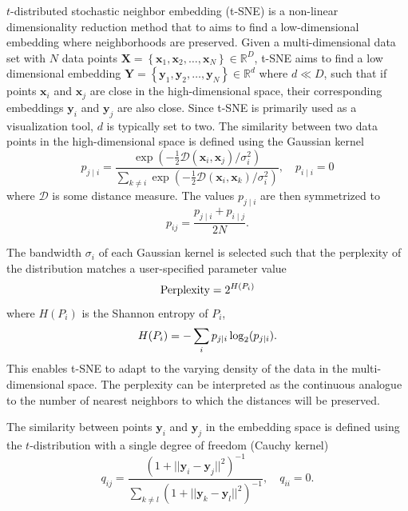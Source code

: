 \documentclass[article]{jss}
\begin{document}
$t$-distributed stochastic neighbor embedding (t-SNE) is a non-linear
dimensionality reduction method that to aims to find a low-dimensional embedding
where neighborhoods are preserved. Given a multi-dimensional data set with $N$ data points
$\mathbf{X} = \left \{ \mathbf{x}_1, \mathbf{x}_2, \dots, \mathbf{x}_N \right \}
\in \mathbb{R}^D$, t-SNE
aims to find a low dimensional embedding $\mathbf{Y} = \left \{ \mathbf{y}_1,
\mathbf{y}_2, \dots, \mathbf{y}_N \right\} \in \mathbb{R}^d$ where $d \ll D$,
such that if points $\mathbf{x}_i$ and $\mathbf{x}_j$ are close in the
high-dimensional space, their corresponding embeddings $\mathbf{y}_i$ and
$\mathbf{y}_j$ are also close. Since t-SNE is primarily used as a visualization
tool, $d$ is typically set to two. The similarity between two data points in the
high-dimensional space is defined using the Gaussian kernel
\begin{equation}
p_{j \mid i} = \frac{\exp \left ( -\frac{1}{2} \mathcal{D}(\mathbf{x}_i, \mathbf{x}_j ) / \sigma_i^2 \right )}
{\sum_{k \neq i } \exp \left ( -\frac{1}{2} \mathcal{D}(\mathbf{x}_i, \mathbf{x}_k ) / \sigma_i^2 \right )}, \quad p_{i \mid i} = 0
\label{eq:p_ij}
\end{equation}
where $\mathcal{D}$ is some distance measure. The values $p_{j \mid i}$
are then symmetrized to
\begin{equation}
p_{ij} = \frac{p_{j \mid i} + p_{i \mid j}}{2N}.
\label{eq:symmetrize}
\end{equation}

The bandwidth $\sigma_i$ of each Gaussian kernel is selected such that the perplexity of the distribution matches a user-specified parameter value
\begin{equation}
\text{Perplexity} = 2^{H(P_i)} \notag
\end{equation}
where $H(P_i)$ is the Shannon entropy of $P_i$,
\begin{equation}
H(P_i) = -\sum_i p_{j \mid i} \log_2 (p_{j \mid i}). \notag
\end{equation}
This enables t-SNE to adapt to the varying density of the data in the
multi-dimensional space. The perplexity can be interpreted as the continuous
analogue to the number of nearest neighbors to which the distances will be
preserved. 

The similarity between points $\mathbf{y}_i$ and $\mathbf{y}_j$ in the embedding
space is defined using the $t$-distribution with a single degree of freedom
(Cauchy kernel)
\begin{equation}
q_{ij} = \frac{\left ( 1 + || \mathbf{y}_i - \mathbf{y}_j ||^2 \right )^{-1}}
{\sum_{k \neq l}\left ( 1 + || \mathbf{y}_k - \mathbf{y}_l ||^2 \right )^{-1}},
\quad q_{ii} = 0.
\label{eq:cauchy_kernel}
\end{equation}
\end{document}
